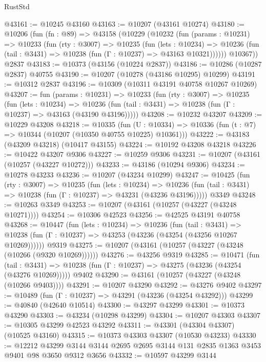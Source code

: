 \begin{lexlean}{RustStd}
\begin{coremodule}
@43161 := @10245 @43160
@43163 := @10207 (@43161 @10274)
@43180 := @10206
    (fun (fn : @89) =>
    @43158
      (@10229
        (@10232
          (fun (params : @10231) =>
          @10233
            (fun (rty : @3007) =>
            @10235
              (fun (lets : @10234) =>
              @10236 (fun (tail : @3431) => @10238 (fun (Γ : @10237) => @43163 @10321))))))
        @10367))
    @2837
@43183 := @10373 (@43156 (@10224 @2837))
@43186 := @10286 (@10287 @2837) @40755
@43190 := @10207 (@10278 (@43186 @10295) @10299)
@43191 := @10312 @2837
@43196 := @10309 (@10311 @43191 @40758 @10267 @10269)
@43207 := fun (params : @10231) =>
  @10233
    (fun (rty : @3007) =>
    @10235
      (fun (lets : @10234) =>
      @10236 (fun (tail : @3431) => @10238 (fun (Γ : @10237) => @43163 (@43190 @43196)))))
@43208 := @10232 @43207
@43209 := @10229 @43208
@43218 := @10335
    (fun (U : @10334) => @10336 (fun (t : @7) => @10344 (@10207 (@10350 @40755 @10225) @10361)))
@43222 := @43183 (@43209 @43218) (@10417 @43155)
@43224 := @10192 @43208 @43218
@43226 := @10422 @43207 @9306
@43227 := @10259 @9306
@43231 := @10207 (@43161 (@10257 (@43227 @10272)))
@43233 := @43186 (@10294 @9306)
@43234 := @10278 @43233
@43236 := @10207 (@43234 @10299)
@43247 := @10425
    (fun (rty : @3007) =>
    @10235
      (fun (lets : @10234) =>
      @10236 (fun (tail : @3431) => @10238 (fun (Γ : @10237) => @43231 (@43236 @43196)))))
    @3349
@43248 := @10263 @3349
@43253 := @10207 (@43161 (@10257 (@43227 (@43248 @10271))))
@43254 := @10306 @42523
@43256 := @42525 @43191 @40758
@43268 := @10447
    (fun (lets : @10234) =>
    @10236
      (fun (tail : @3431) =>
      @10238 (fun (Γ : @10237) => @43253 (@43236 (@43254 (@43256 @10267 @10269))))))
    @9319
@43275 := @10207 (@43161 (@10257 (@43227 (@43248 (@10266 (@9320 @10269))))))
@43276 := @43256 @9319
@43285 := @10471
    (fun (tail : @3431) => @10238 (fun (Γ : @10237) => @43275 (@43236 (@43254 (@43276 @10269)))))
    @9402
@43290 := @43161 (@10257 (@43227 (@43248 (@10266 @9403))))
@43291 := @10207 @43290
@43292 := @43276 @9402
@43297 := @10489 (fun (Γ : @10237) => @43291 (@43236 (@43254 @43292)))
@43299 := @40840 (@42640 @10514)
@43300 := @43297 @43299
@43301 := @10373 @43290
@43303 := @43234 (@10298 @43299)
@43304 := @10207 @43303
@43307 := @10305 @43299 @42523 @43292
@43311 := @43301 (@43304 @43307) (@10525 @43160)
@43315 := @10373 @43303 @43307 (@10530 @43233)
@43330 := @12212
    @43299
    @3144
    @3144
    @2695
    @2695
    @3144
    @131
    @2835
    @1363
    @3453
    @9401
    @98
    @3650
    @9312
    @3656
@43332 := @10597 @43299 @3144

\end{coremodule}
\end{lexlean}
